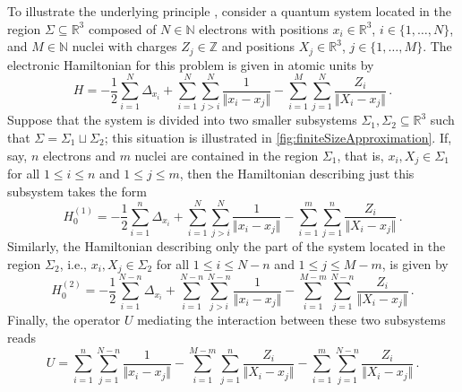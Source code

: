 \documentclass[a4paper, twoside, 11pt, reqno]{amsart}
\theoremstyle{definition}
\theoremstyle{plain}
\renewcommand{\subset}{\subseteq}
\renewcommand{\Delta}{\varDelta}
\renewcommand{\Sigma}{\varSigma}
\newcommand{\N}{\mathbb{N}}
\newcommand{\Z}{\mathbb{Z}}
\newcommand{\R}{\mathbb{R}}
\newcommand{\1}{\mathbf{1}}
\newcommand{\set}[2][]{#1\{{#2}#1\}}
\newcommand{\norm}[2][]{#1\Vert{#2}#1\Vert}
\begin{document}
To illustrate the underlying principle  \cite[Sect.~5]{Reible2022},  consider a quantum system located in the region $\Sigma \subset \R^3$ composed of $N \in \N$ electrons with positions $x_i \in \R^3$, $i \in \set{1, \dotsc, N}$, and $M \in \N$ nuclei with charges $Z_j \in \Z$ and positions $X_j \in \R^3$, $j \in \set{1, \dotsc, M}$. The electronic Hamiltonian for this problem is given in atomic units by
\begin{equation*}
    H = - \frac{1}{2} \sum_{i=1}^{N} \Delta_{x_i} + \sum_{i=1}^{N} \sum_{j>i}^{N} \frac{1}{\norm{x_i - x_j}} - \sum_{i=1}^{M} \sum_{j=1}^{N} \frac{Z_i}{\norm{X_i - x_j}} \, .
\end{equation*}
Suppose that the system is divided into two smaller subsystems $\Sigma_1, \Sigma_2 \subset \R^3$ such that $\Sigma = \Sigma_1 \sqcup \Sigma_2$; this situation is illustrated in \cref{fig:finiteSizeApproximation}. If, say, $n$ electrons and $m$ nuclei are contained in the region $\Sigma_1$, that is, $x_i, X_j \in \Sigma_1$ for all $1 \le i \le n$ and $1 \le j \le m$, then the Hamiltonian describing just this subsystem takes the form
\begin{equation*}
    H_0^{(1)} = - \frac{1}{2} \sum_{i=1}^{n} \Delta_{x_i} + \sum_{i=1}^{N} \sum_{j>i}^{N} \frac{1}{\norm{x_i - x_j}} - \sum_{i=1}^{m} \sum_{j=1}^{n} \frac{Z_i}{\norm{X_i - x_j}} \, .
\end{equation*}
Similarly, the Hamiltonian describing only the part of the system located in the region $\Sigma_2$, i.e., $x_i, X_j \in \Sigma_2$ for all $1 \le i \le N - n$ and $1 \le j \le M - m$, is given by
\begin{equation*}
    H_0^{(2)} = - \frac{1}{2} \sum_{i=1}^{N-n} \Delta_{x_i} + \sum_{i=1}^{N-n} \sum_{j>i}^{N-n} \frac{1}{\norm{x_i - x_j}} - \sum_{i=1}^{M-m} \sum_{j=1}^{N-n} \frac{Z_i}{\norm{X_i - x_j}} \, .
\end{equation*}
Finally, the operator $U$ mediating the interaction between these two subsystems reads
\begin{equation*}
    U = \sum_{i=1}^{n} \sum_{j=1}^{N-n} \frac{1}{\norm{x_i - x_j}} - \sum_{i=1}^{M-m} \sum_{j=1}^{n} \frac{Z_i}{\norm{X_i - x_j}} - \sum_{i=1}^{m} \sum_{j=1}^{N-n} \frac{Z_i}{\norm{X_i - x_j}} \, .
\end{equation*}
\end{document}
